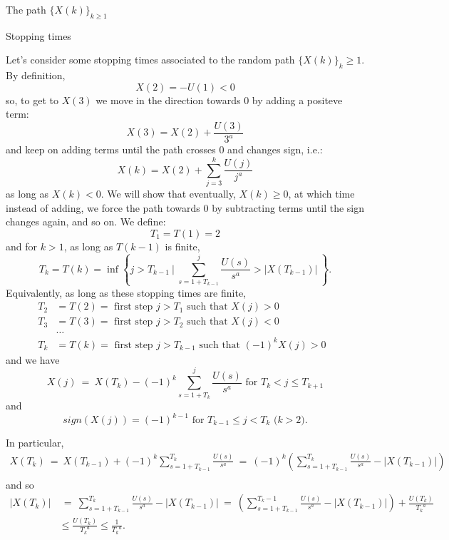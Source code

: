 \documentclass[12pt]{article}
\begin{document}
\begin{section}{The path $\{X(k)\}_{k\ge1}$ }  


\begin{subsection}{Stopping times} 
		
\hspace{20pt}Let's consider some stopping times associated to the random path $\{X(k)\}_k\ge1$. By definition,
$$
X(2)=- U(1) <0 
$$ 
so, to get to $X(3)$ we move in the direction towards $0$ by adding a positeve term: 
$$
X(3) = X(2) + \frac{U(3)}{3^a}
$$ 
and keep on adding terms until the path crosses $0$ and changes sign, i.e.:
$$
X(k) = X(2) + \sum_{j=3}^{k} \frac{U(j)}{j^a}
$$
as long as $X(k) < 0$. We will show that eventually, $X(k) \ge 0$, at which time instead of adding, we force the path towards $0$ by subtracting terms until the sign changes again, and so on. We define:
\begin{equation}
T_1 = T(1) = 2
\end{equation}
and for $k>1$, as long as $T(k-1)$ is finite,
\begin{equation} \label{Tk}
T_k = T(k) = \inf\left\{j > T_{k-1} \ \Bigg| \  \sum_{s=1+T_{k-1}}^{j} \frac{U(s)}{s^a} > |X(T_{k-1})|  \   \right\}.
\end{equation}
  Equivalently, as long as these stopping times are finite,
 \begin{align*} \label{Tk}
 T_2 &= T(2) = \text{ first step $j > T_1$ such that $X(j) > 0$} \\
  T_3 &= T(3) = \text{ first step $j > T_2$ such that $X(j) < 0$} \\
  &\dots \\
  T_k &= T(k) = \text{ first step $j > T_{k-1}$ such that $(-1)^k X(j) > 0$ } 
 \end{align*} 
and we have 
\begin{equation} \label{eq:Xj}
X(j) ~=~ X(T_{k}) - (-1)^k \sum_{s=1+T_{k}}^{j} \frac{U(s)}{s^a}
   \text{ for } T_{k} <j\le T_{k+1}
\end{equation}
and
\begin{equation}
sign(X(j)) = (-1)^{k-1} \text{ for $T_{k-1} \le j < T_k$ ($k>2$)}.
\end{equation}

In particular,
\begin{align*}
X(T_k) ~=~ X(T_{k-1}) + (-1)^k \sum_{s=1+T_{k-1}}^{T_k} \frac{U(s)}{s^a}  
~=~ (-1)^{k} \left( \sum_{s=1+T_{k-1}}^{T_k} \frac{U(s)}{s^a} - |X(T_{k-1})| \right)   \\
\end{align*}
and so
\begin{align} \label{eq:XleT}
|X(T_k)| &~=~ \sum_{s=1+T_{k-1}}^{T_k} \frac{U(s)}{s^a} - |X(T_{k-1})| ~=~ \left( \sum_{s=1+T_{k-1}}^{T_k-1} \frac{U(s)}{s^a} - |X(T_{k-1})| \right) +
 \frac{U(T_k)}{{T_k}^a}   \nonumber\\
 &\le \frac{U(T_k)}{{T_k}^a} \le \frac{1}{{T_k}^a}.
\end{align}  


\end{subsection}
\end{section}
\end{document}

